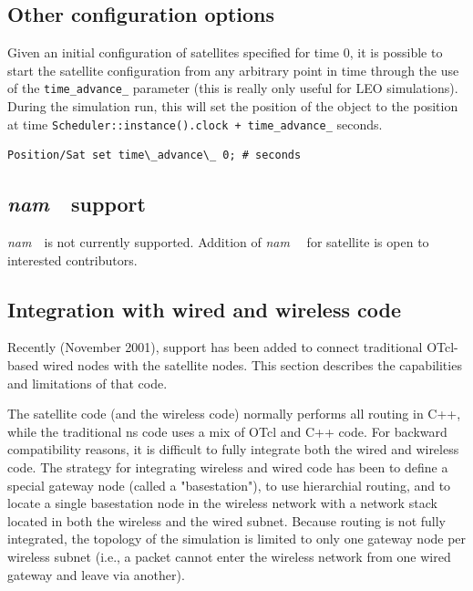 \subsection{Other configuration options}
\label{sec:satellite/usage/other}

Given an initial configuration of satellites specified for time $0$, 
it is possible to start the 
satellite configuration from any arbitrary point in time through the use of the
{\tt time\_advance\_} parameter (this is really only useful for LEO
simulations). During the simulation run, this will set the position of 
the object to the position at time
{\tt Scheduler::instance().clock + time\_advance\_} seconds.
\begin{verbatim}
Position/Sat set time\_advance\_ 0; # seconds          
\end{verbatim}



\subsection{\emph{nam}~~support}
\label{sec:satellite/usage/nam}
\emph{nam}~~is not currently supported.  Addition of \emph{nam}~~ for satellite
is open to interested contributors.


\subsection{Integration with wired and wireless code}
\label{sec:satellite/usage/integration}

Recently (November 2001), support has been added to connect traditional
OTcl-based wired nodes with the satellite nodes.  This section describes
the capabilities and limitations of that code.

The satellite code (and the wireless code) normally performs all routing 
in C++, while the traditional ns code uses a mix of OTcl and C++ code.   
For backward compatibility reasons, it is difficult to fully integrate
both the wired and wireless code.   The strategy for integrating wireless 
and wired code has been to define a special gateway node (called a 
"basestation"), to use hierarchial routing, and to locate a single basestation 
node in the wireless network with a network stack located in both the
wireless and the wired subnet.  Because routing is not fully integrated, 
the topology of the simulation is limited to only one gateway node per
wireless subnet (i.e., a packet cannot enter the wireless network from 
one wired gateway and leave via another).


